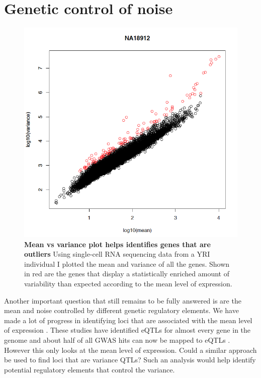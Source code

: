 \section{Genetic control of noise}

\begin{figure}[t!]  
    \centering
    \includegraphics[width=\linewidth, scale=0.25]{figures/intro/intro_outlier1.png}
    \caption[Mean vs variance plot helps identifies genes that are outliers]{%
        \textbf{Mean vs variance plot helps identifies genes that are outliers}
        Using single-cell RNA sequencing data from a YRI individual \cite{sarkar_discovery_2018} I plotted the mean and variance of all the genes. Shown in red are the genes that display a statistically enriched amount of variability than expected according to the mean level of expression. 
    }
    \label{fig:intro1}
\end{figure}

Another important question that still remains to be fully answered is are the mean and noise controlled by different genetic regulatory elements. We have made a lot of progress in identifying loci that are associated with the mean level of expression \cite{gtex_consortium_genetic_2017} \cite{vosa2021ng} \cite{wen2017pg}. These studies have identified eQTLs for almost every gene in the genome and about half of all GWAS hits can now be mapped to eQTLs \cite{gtex_consortium_genetic_2017}. However this only looks at the mean level of expression. Could a similar approach be used to find loci that are variance QTLs? Such an analysis would help identify potential regulatory elements that control the variance.

